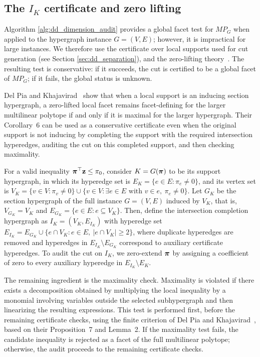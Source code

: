 \subsection{The $I_K$ certificate and zero lifting}
\label{subsec:local_facet_zero_lifting}

Algorithm \ref{alg:dd_dimension_audit} provides a global facet test for $MP_G$ when applied to the hypergraph instance $ G = (V,E)$; however, it is impractical for large instances. We therefore use the certificate over local supports used for cut generation (see Section \ref{sec:dd_separation}), and the zero-lifting theory~\cite{del2017polyhedral}. The resulting test is conservative: if it succeeds, the cut is certified to be a global facet of $MP_G$; if it fails, the global status is unknown.

Del Pia and Khajavirad~\cite{del2017polyhedral} show that when a local support is an inducing section hypergraph, a zero-lifted local facet remains facet-defining for the larger multilinear polytope if and only if it is maximal for the larger hypergraph. Their Corollary~6 can be used as a conservative certificate even when the original support is not inducing by completing the support with the required intersection hyperedges, auditing the cut on this completed support, and then checking maximality.

For a valid inequality $\bm{\pi}^\top \mathbf{z}\le \pi_0$, consider $K=G(\bm{\pi})$  to be its support hypergraph, in which its hyperedge set is $E_K=\{e\in E : \pi_e\ne 0\}$, and its vertex set is $V_K=
\{v\in V : \pi_v\ne 0\}
\cup
\{v\in V : \exists e\in E \text{ with } v\in e,\ \pi_e\ne 0\}$.
Let $G_K$ be the section hypergraph of the full instance $G=(V,E)$ induced by $V_K$, that is, $V_{G_K}=V_K$ and $E_{G_K}=\{e\in E : e\subseteq V_K\}$. Then, define the intersection completion hypergraph as $I_K=(V_K,E_{I_K})$ with hyperedge set  $E_{I_K}= E_{G_K}\cup\{e\cap V_K : e\in E,\ |e\cap V_K|\ge 2\}$, where duplicate hyperedges are removed and hyperedges in $E_{I_K}\setminus E_{G_K}$ correspond to auxiliary certificate hyperedges. To audit the cut on $I_K$, we zero-extend $\bm{\pi}$ by assigning a coefficient of zero to every auxiliary hyperedge in $E_{I_K}\setminus E_K$.

The remaining ingredient is the maximality check. Maximality is violated if there exists a decomposition obtained by multiplying the local inequality by a monomial involving variables outside the selected subhypergraph and then linearizing the resulting expressions. This test is performed first, before the remaining certificate checks, using the finite criterion of Del Pia and Khajavirad~\cite{del2017polyhedral}, based on their Proposition~7 and Lemma~2. If the maximality test fails, the candidate inequality is rejected as a facet of the full multilinear polytope; otherwise, the audit proceeds to the remaining certificate checks.



